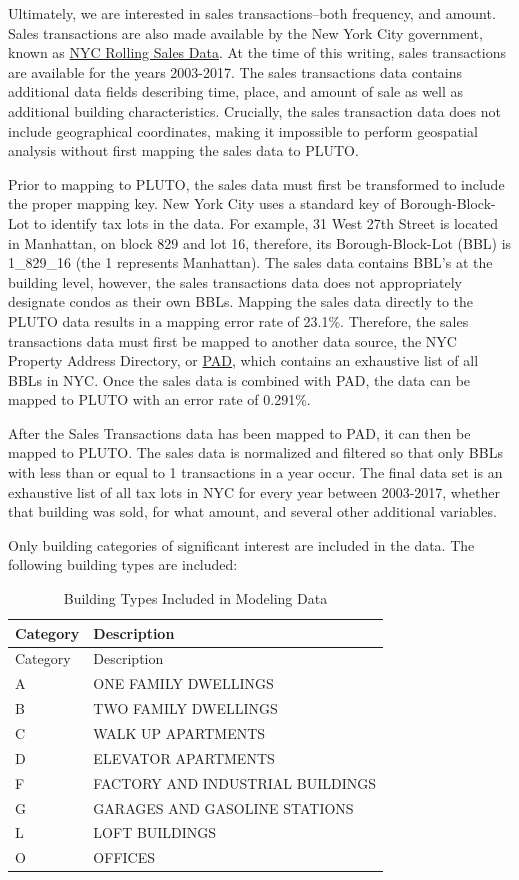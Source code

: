 \documentclass[]{article}
\begin{document}
Ultimately, we are interested in sales transactions--both frequency, and
amount. Sales transactions are also made available by the New York City
government, known as
\href{http://www1.nyc.gov/site/finance/taxes/property-annualized-sales-update.page}{NYC
Rolling Sales Data}. At the time of this writing, sales transactions are
available for the years 2003-2017. The sales transactions data contains
additional data fields describing time, place, and amount of sale as
well as additional building characteristics. Crucially, the sales
transaction data does not include geographical coordinates, making it
impossible to perform geospatial analysis without first mapping the
sales data to PLUTO.

Prior to mapping to PLUTO, the sales data must first be transformed to
include the proper mapping key. New York City uses a standard key of
Borough-Block-Lot to identify tax lots in the data. For example, 31 West
27th Street is located in Manhattan, on block 829 and lot 16, therefore,
its Borough-Block-Lot (BBL) is 1\_829\_16 (the 1 represents Manhattan).
The sales data contains BBL's at the building level, however, the sales
transactions data does not appropriately designate condos as their own
BBLs. Mapping the sales data directly to the PLUTO data results in a
mapping error rate of 23.1\%. Therefore, the sales transactions data
must first be mapped to another data source, the NYC Property Address
Directory, or
\href{https://data.cityofnewyork.us/City-Government/Property-Address-Directory/bc8t-ecyu/data}{PAD},
which contains an exhaustive list of all BBLs in NYC. Once the sales
data is combined with PAD, the data can be mapped to PLUTO with an error
rate of 0.291\%.

After the Sales Transactions data has been mapped to PAD, it can then be
mapped to PLUTO. The sales data is normalized and filtered so that only
BBLs with less than or equal to 1 transactions in a year occur. The
final data set is an exhaustive list of all tax lots in NYC for every
year between 2003-2017, whether that building was sold, for what amount,
and several other additional variables.

Only building categories of significant interest are included in the
data. The following building types are included:

\begin{longtable}[]{@{}ll@{}}
\caption{Building Types Included in Modeling Data}\tabularnewline
\toprule
Category & Description\tabularnewline
\midrule
\endfirsthead
\toprule
Category & Description\tabularnewline
\midrule
\endhead
A & ONE FAMILY DWELLINGS\tabularnewline
B & TWO FAMILY DWELLINGS\tabularnewline
C & WALK UP APARTMENTS\tabularnewline
D & ELEVATOR APARTMENTS\tabularnewline
F & FACTORY AND INDUSTRIAL BUILDINGS\tabularnewline
G & GARAGES AND GASOLINE STATIONS\tabularnewline
L & LOFT BUILDINGS\tabularnewline
O & OFFICES\tabularnewline
\bottomrule
\end{longtable}
\end{document}
